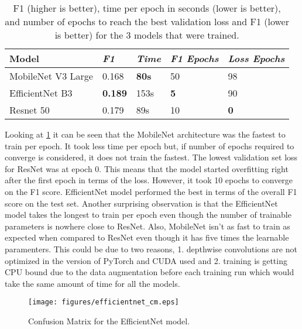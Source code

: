 \documentclass[conference]{IEEEtran}
\begin{document}
\begin{table}[htbp]
    \caption{F1 (higher is better), time per epoch in seconds (lower is better), and number of epochs to reach the best validation loss and F1 (lower is better) for the 3 models that were trained.}
    \centering
    \boldmath
    \begin{tabular}{p{2cm}|p{1cm}|p{1cm}|p{1.2cm}|p{1cm}}
    \hline
    Model & \emph{F1} & \emph{Time} & \emph{F1 Epochs} & \emph{Loss Epochs}\\
    \hline
    MobileNet V3 Large & 0.168 & \textbf{80s} & 50 & 98\\
    \hline
    EfficientNet B3 & \textbf{0.189} & 153s & \textbf{5} & 90\\
    \hline
    Resnet 50 & 0.179 & 89s & 10 & \textbf{0}\\
    \hline
    \end{tabular}
    \label{tab:test_metrics}
    \end{table}

Looking at \ref{tab:test_metrics} it can be seen that the MobileNet architecture was 
the fastest to train per epoch. It took less time per epoch but, if number of epochs required to converge is considered, it does not train the fastest. The lowest validation set loss for ResNet was at epoch 0. This means that the model started overfitting right after the first epoch in terms of the loss. However, it took 10 epochs to converge on the F1 score.  EfficientNet model performed the best in terms of the overall F1 score on the test set. Another surprising observation is that the EfficientNet model takes the longest to train per epoch even though the number of trainable parameters is nowhere close to ResNet. 
Also, MobileNet isn't as fast to train as expected when compared to ResNet even though 
it has five times the learnable paramenters. This could be due to two reasons, 1. depthwise convolutions are not optimized in the version of PyTorch and CUDA used and 2. training is getting CPU bound due to the data augmentation before each training run which would take the same amount of time for all the models. 

\begin{figure}[htbp]
    \centering
    \texttt{[image: figures/efficientnet\_cm.eps]}  
    \caption{Confusion Matrix for the EfficientNet model.}
    \label{fig:conf}
  \end{figure}
\end{document}
